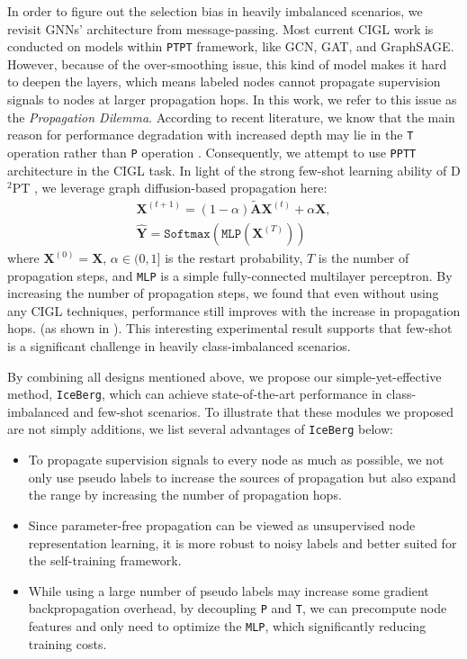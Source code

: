 In order to figure out the selection bias in heavily imbalanced scenarios, we revisit GNNs' architecture from message-passing. Most current CIGL work is conducted on models within \texttt{PTPT} framework, like GCN, GAT, and GraphSAGE. However, because of the over-smoothing issue, this kind of model makes it hard to deepen the layers, which means labeled nodes cannot propagate supervision signals to nodes at larger propagation hops. In this work, we refer to this issue as the \emph{Propagation Dilemma}. According to recent literature, we know that the main reason for performance degradation with increased depth may lie in the \texttt{T} operation rather than \texttt{P} operation \cite{zhang2022model,wang2024snowflake}. Consequently, we attempt to use \texttt{PPTT} architecture in the CIGL task. In light of the strong few-shot learning ability of D$^2$PT \cite{liu2023learning}, we leverage graph diffusion-based propagation here:
\begin{gather}
    \mathbf{X}^{(t+1)} = (1-\alpha)\tilde{\mathbf{A}}\mathbf{X}^{(t)} + \alpha\mathbf{X}, \\
    \hat{\mathbf{Y}}=\texttt{Softmax}(\texttt{MLP}(\mathbf{X}^{(T)}))
\end{gather}
where $\mathbf{X}^{(0)}=\mathbf{X}$, $\alpha\in(0,1]$ is the restart probability, $T$ is the number of propagation steps, and \texttt{MLP} is a simple fully-connected multilayer perceptron. By increasing the number of propagation steps, we found that even without using any CIGL techniques, performance still improves with the increase in propagation hops. (as shown in ). This interesting experimental result supports that few-shot is a significant challenge in heavily class-imbalanced scenarios.

By combining all designs mentioned above, we propose our simple-yet-effective method, \texttt{IceBerg}, which can achieve state-of-the-art performance in class-imbalanced and few-shot scenarios. To illustrate that these modules we proposed are not simply additions, we list several advantages of \texttt{IceBerg} below:
\begin{itemize}[leftmargin=*]
    \item To propagate supervision signals to every node as much as possible, we not only use pseudo labels to increase the sources of propagation but also expand the range by increasing the number of propagation hops.
    \item Since parameter-free propagation can be viewed as unsupervised node representation learning, it is more robust to noisy labels and better suited for the self-training framework.
    \item While using a large number of pseudo labels may increase some gradient backpropagation overhead, by decoupling \texttt{P} and \texttt{T}, we can precompute node features and only need to optimize the \texttt{MLP}, which significantly reducing training costs.
\end{itemize}


